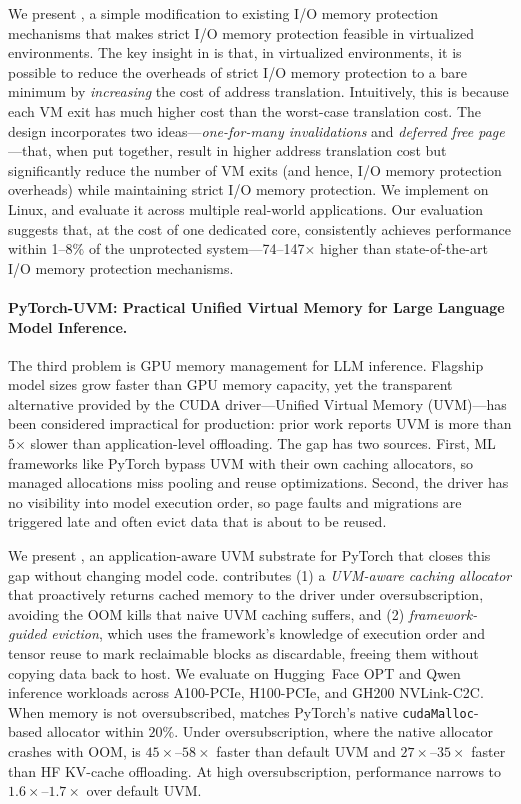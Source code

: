 We present {\vFreebrand}, a simple modification to existing I/O memory protection
mechanisms that makes strict I/O memory protection feasible in virtualized environments.
The key insight in {\vFreebrand} is that, in virtualized environments,
it is possible to reduce the overheads of strict I/O memory protection
to a bare minimum by \textit{increasing} the cost of address translation.
Intuitively, this is because each VM exit has much higher cost
than the worst-case translation cost.
The {\vFreebrand} design incorporates two ideas---\textit{one-for-many invalidations}
and \textit{deferred free page}---that, when put together, result in higher
address translation cost but significantly reduce the number of VM exits
(and hence, I/O memory protection overheads) while maintaining strict I/O memory protection.
We implement {\vFreebrand} on Linux, and evaluate it across multiple real-world applications.
Our evaluation suggests that, at the cost of one dedicated core,
{\vFreebrand} consistently achieves performance within 1--8$\%$ of
the unprotected system---74--147$\times$ higher than state-of-the-art I/O memory protection mechanisms.

\paragraph{PyTorch-UVM: Practical Unified Virtual Memory for Large Language Model Inference.}
The third problem is GPU memory management for LLM inference.
Flagship model sizes grow faster than GPU memory capacity,
yet the transparent alternative provided by the CUDA driver---Unified Virtual
Memory (UVM)---has been considered impractical for production: prior work
reports UVM is more than 5$\times$ slower than application-level offloading.
The gap has two sources.
First, ML frameworks like PyTorch bypass UVM with their own caching allocators,
so managed allocations miss pooling and reuse optimizations.
Second, the driver has no visibility into model execution order,
so page faults and migrations are triggered late and often evict data that is
about to be reused.

We present {\pytorchUVMbrand}, an application-aware UVM substrate for PyTorch
that closes this gap without changing model code.
{\pytorchUVMbrand} contributes (1) a \emph{UVM-aware caching allocator}
that proactively returns cached memory to the driver under oversubscription,
avoiding the OOM kills that naive UVM caching suffers,
and (2) \emph{framework-guided eviction}, which uses the framework's knowledge of
execution order and tensor reuse to mark reclaimable blocks as discardable,
freeing them without copying data back to host.
We evaluate on Hugging~Face OPT and Qwen inference workloads
across A100-PCIe, H100-PCIe, and GH200 NVLink-C2C.
When memory is not oversubscribed, {\pytorchUVMbrand} matches PyTorch's native
\texttt{cudaMalloc}-based allocator within $20\%$.
Under oversubscription, where the native allocator crashes with OOM,
{\pytorchUVMbrand} is $45\times$--$58\times$ faster than default UVM
and $27\times$--$35\times$ faster than HF KV-cache offloading.
At high oversubscription, performance narrows to $1.6\times$--$1.7\times$ over default UVM.

